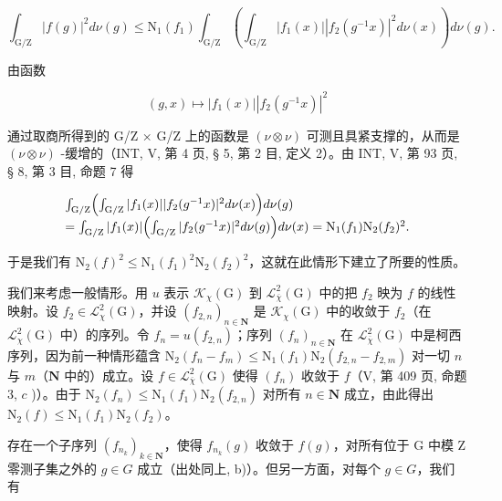 \[
\int_ {\mathrm{G} / \mathrm{Z}} | f (g) | ^ {2} d \nu (g) \leqslant \mathrm{N} _ {1} (f _ {1}) \int_ {\mathrm{G} / \mathrm{Z}} \left(\int_ {\mathrm{G} / \mathrm{Z}} | f _ {1} (x) | | f _ {2} (g ^ {- 1} x) | ^ {2} d \nu (x)\right) d \nu (g).
\]

由函数

\[
(g, x) \mapsto | f _ {1} (x) | | f _ {2} (g ^ {- 1} x) | ^ {2}
\]

通过取商所得到的 G/Z × G/Z 上的函数是 \((\nu \otimes \nu)\) 可测且具紧支撑的，从而是 \((\nu \otimes \nu)\) -缓增的（INT, V, 第 4 页, § 5, 第 2 目, 定义 2）。由 INT, V, 第 93 页, § 8, 第 3 目, 命题 7 得

\[
\begin{array}{l} \int_ {\mathrm{G} / \mathrm{Z}} \Bigl (\int_ {\mathrm{G} / \mathrm{Z}} | f _ {1} (x) |   | f _ {2} (g ^ {- 1} x) | ^ {2} d \nu (x) \Bigr) d \nu (g) \\ = \int_ {\mathrm{G} / \mathrm{Z}} | f _ {1} (x) | \Bigl (\int_ {\mathrm{G} / \mathrm{Z}} | f _ {2} (g ^ {- 1} x) | ^ {2} d \nu (g) \Bigr) d \nu (x) = \mathrm{N} _ {1} (f _ {1}) \mathrm{N} _ {2} (f _ {2}) ^ {2}. \end{array}
\]

于是我们有 \(\mathrm{N}_{2}(f)^{2}\leqslant\mathrm{N}_{1}(f_{1})^{2}\mathrm{N}_{2}(f_{2})^{2}\)，这就在此情形下建立了所要的性质。

 我们来考虑一般情形。用 \(u\) 表示 \(\mathcal{K}_{\chi}(\mathrm{G})\) 到 \(\mathcal{L}_{\overline{\chi}}^{2}(\mathrm{G})\) 中的把 \(f_{2}\) 映为 \(f\) 的线性映射。设 \(f_{2} \in \mathcal{L}_{\chi}^{2}(\mathrm{G})\)，并设 \((f_{2,n})_{n \in \mathbf{N}}\) 是 \(\mathcal{K}_{\chi}(\mathrm{G})\) 中的收敛于 \(f_{2}\)（在 \(\mathcal{L}_{\chi}^{2}(\mathrm{G})\) 中）的序列。令 \(f_{n} = u(f_{2,n})\)；序列 \((f_{n})_{n \in \mathbf{N}}\) 在 \(\mathcal{L}_{\overline{\chi}}^{2}(\mathrm{G})\) 中是柯西序列，因为前一种情形蕴含 \(\mathrm{N}_{2}(f_{n} - f_{m}) \leqslant \mathrm{N}_{1}(f_{1})\mathrm{N}_{2}(f_{2,n} - f_{2,m})\) 对一切 \(n\) 与 \(m\)（\(\mathbf{N}\) 中的）成立。设 \(f \in \mathcal{L}_{\overline{\chi}}^{2}(\mathrm{G})\) 使得 \((f_{n})\) 收敛于 \(f\)（V, 第 409 页, 命题 3, \(c\) )）。由于 \(\mathrm{N}_{2}(f_{n}) \leqslant \mathrm{N}_{1}(f_{1})\mathrm{N}_{2}(f_{2,n})\) 对所有 \(n \in \mathbf{N}\) 成立，由此得出 \(\mathrm{N}_{2}(f) \leqslant \mathrm{N}_{1}(f_{1})\mathrm{N}_{2}(f_{2})\)。

存在一个子序列 \((f_{n_{k}})_{k\in\mathbf{N}}\)，使得 \(f_{n_{k}}(g)\) 收敛于 \(f(g)\)，对所有位于 G 中模 Z 零测子集之外的 \(g\in G\) 成立（出处同上, b)）。但另一方面，对每个 \(g\in G\)，我们有

